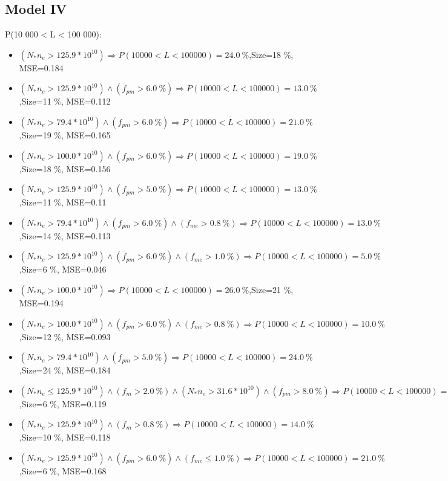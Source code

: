 \documentclass[numbered]{CSL}
\begin{document}
\subsection{Model IV}
P(10 000 < L < 100 000):
\begin{itemize}
\item $(N_* n_e > 125.9 * 10^{10}) \Rightarrow P(10 000 < L < 100 000) = 24.0~\%$,\hfill Size=18 \%, MSE=0.184
\item $(N_* n_e > 125.9 * 10^{10}) \land (f_{pm} > 6.0~\%) \Rightarrow P(10 000 < L < 100 000) = 13.0~\%$,\hfill Size=11 \%, MSE=0.112
\item $(N_* n_e > 79.4 * 10^{10}) \land (f_{pm} > 6.0~\%) \Rightarrow P(10 000 < L < 100 000) = 21.0~\%$,\hfill Size=19 \%, MSE=0.165
\item $(N_* n_e > 100.0 * 10^{10}) \land (f_{pm} > 6.0~\%) \Rightarrow P(10 000 < L < 100 000) = 19.0~\%$,\hfill Size=18 \%, MSE=0.156
\item $(N_* n_e > 125.9 * 10^{10}) \land (f_{pm} > 5.0~\%) \Rightarrow P(10 000 < L < 100 000) = 13.0~\%$,\hfill Size=11 \%, MSE=0.11
\item $(N_* n_e > 79.4 * 10^{10}) \land (f_{pm} > 6.0~\%) \land (f_{me} > 0.8~\%) \Rightarrow P(10 000 < L < 100 000) = 13.0~\%$,\hfill Size=14 \%, MSE=0.113
\item $(N_* n_e > 125.9 * 10^{10}) \land (f_{pm} > 6.0~\%) \land (f_{me} > 1.0~\%) \Rightarrow P(10 000 < L < 100 000) = 5.0~\%$,\hfill Size=6 \%, MSE=0.046
\item $(N_* n_e > 100.0 * 10^{10}) \Rightarrow P(10 000 < L < 100 000) = 26.0~\%$,\hfill Size=21 \%, MSE=0.194
\item $(N_* n_e > 100.0 * 10^{10}) \land (f_{pm} > 6.0~\%) \land (f_{me} > 0.8~\%) \Rightarrow P(10 000 < L < 100 000) = 10.0~\%$,\hfill Size=12 \%, MSE=0.093
\item $(N_* n_e > 79.4 * 10^{10}) \land (f_{pm} > 5.0~\%) \Rightarrow P(10 000 < L < 100 000) = 24.0~\%$,\hfill Size=24 \%, MSE=0.184
\item $(N_* n_e \leq 125.9 * 10^{10}) \land (f_m > 2.0~\%) \land (N_* n_e > 31.6 * 10^{10}) \land (f_{pm} > 8.0~\%) \Rightarrow P(10 000 < L < 100 000) = 14.0~\%$,\hfill Size=6 \%, MSE=0.119
\item $(N_* n_e > 125.9 * 10^{10}) \land (f_m > 0.8~\%) \Rightarrow P(10 000 < L < 100 000) = 14.0~\%$,\hfill Size=10 \%, MSE=0.118
\item $(N_* n_e > 125.9 * 10^{10}) \land (f_{pm} > 6.0~\%) \land (f_{me} \leq 1.0~\%) \Rightarrow P(10 000 < L < 100 000) = 21.0~\%$,\hfill Size=6 \%, MSE=0.168

\end{itemize}
\end{document}
